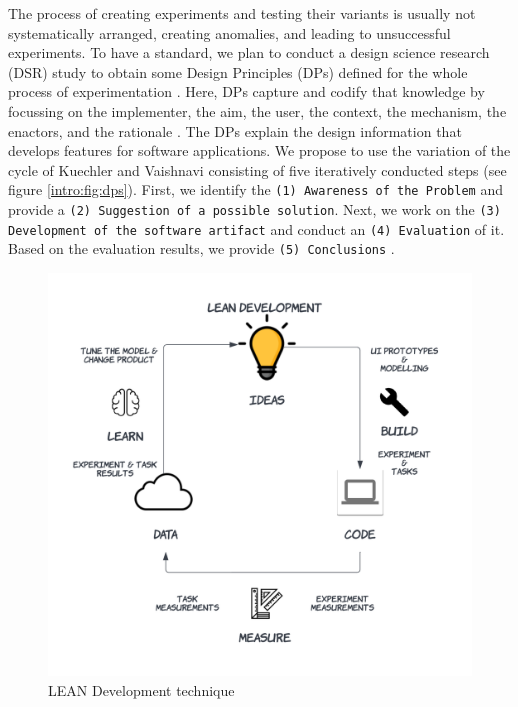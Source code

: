 The process of creating experiments and testing their variants is usually not systematically arranged, creating anomalies, and leading to unsuccessful experiments.
To have a standard, we plan to conduct a design science research (DSR) study to obtain some Design Principles (DPs) defined for the whole process of experimentation \cite{paper:designprinciple:vk}. 
Here, DPs capture and codify that knowledge by focussing on the implementer, the aim, the user, the context, the mechanism, the enactors, and the rationale \cite{paper:designprinciple:gregor}. 
The DPs explain the design information that develops features for software applications.
We propose to use the variation of the cycle of Kuechler and Vaishnavi \cite{paper:designprinciple:vk} consisting of five iteratively conducted steps (see figure \ref{intro:fig:dps}). 
First, we identify the 
\texttt{(1) Awareness of the Problem} and provide a
\texttt{(2) Suggestion of a possible solution}. Next, we work on the 
\texttt{(3) Development of the software artifact} and conduct an 
\texttt{(4) Evaluation} of it. Based on the evaluation results, we provide 
\texttt{(5) Conclusions} \cite{misc:crowdsourcing:sg}.

\begin{figure}[ht]
    \centering
    \includegraphics[scale=0.15]{images/solution-ideas/LEAN.png}
    \caption{LEAN Development technique}
    \label{intro:fig:lean}
\end{figure}


